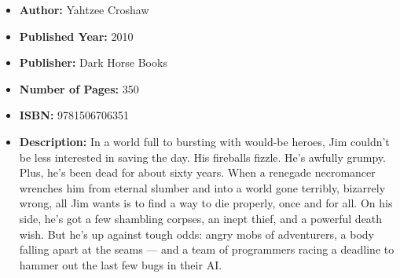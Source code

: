 \documentclass{tufte-handout}
\begin{document}
\begin{itemize}
    \item[] \textbf{Author:} Yahtzee Croshaw
    \item[] \textbf{Published Year:} 2010
    \item[] \textbf{Publisher:} Dark Horse Books
    \item[] \textbf{Number of Pages:} 350
    \item[] \textbf{ISBN:} 9781506706351
    \item[] \textbf{Description:} In a world full to bursting with would-be heroes, Jim couldn't be less interested in saving the day. His fireballs fizzle. He's awfully grumpy. Plus, he's been dead for about sixty years. When a renegade necromancer wrenches him from eternal slumber and into a world gone terribly, bizarrely wrong, all Jim wants is to find a way to die properly, once and for all. On his side, he's got a few shambling corpses, an inept thief, and a powerful death wish. But he's up against tough odds: angry mobs of adventurers, a body falling apart at the seams --- and a team of programmers racing a deadline to hammer out the last few bugs in their AI.
\end{itemize}
\end{document}
